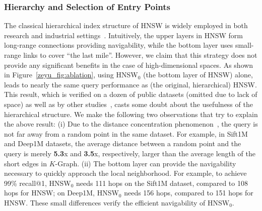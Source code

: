 \documentclass[11pt]{article}
\begin{document}



\subsubsection{Hierarchy and Selection of Entry Points}
The classical hierarchical index structure of HNSW is widely employed in both research and industrial settings~\cite{k-regular,diskann,nsg,milvus}.
Intuitively, the upper layers in HNSW form long-range connections providing navigability, while the bottom layer uses small-range links to cover ``the last mile''.
However, we claim that this strategy does not provide any significant benefits in the case of high-dimensional spaces.
As shown in Figure~\ref{zeyu_fig:ablation}, using HNSW$_0$ (the bottom layer of HNSW) alone, leads to nearly the same query performance as (the original, hierarchical) HNSW. 
This result, which is verified on a dozen of public datasets (omitted due to lack of space) as well as by other studies~\cite{promise}, casts some doubt about the usefulness of the hierarchical structure.
We make the following two observations that try to explain the above result:
(i) Due to the distance concentration phenomenon~\cite{dist-concentrate}, the query is not far away from a random point in the same dataset.
For example, in Sift1M and Deep1M datasets, the average distance between a random point and the query is merely \textbf{5.3}x and \textbf{3.5}x, respectively, larger than the average length of the short edges in $K$-Graph.
(ii) The bottom layer can provide the navigability necessary to quickly approach the local neighborhood.
For example, to achieve 99\% recall@1, HNSW$_0$ needs 111 hops on the Sift1M dataset, compared to 108 hops for HNSW; on Deep1M, HNSW$_0$ needs 156 hops, compared to 151 hops for HNSW.
These small differences verify the efficient navigability of HNSW$_0$.
\end{document}
